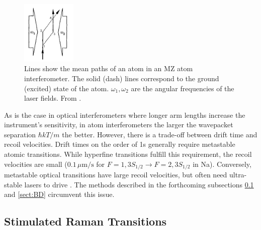\documentclass[reprint,
nofootinbib,
amsmath,amssymb,
aps]{revtex4-1}
\begin{document}
\begin{figure}
	\includegraphics[width=0.23\textwidth]{MZI.png}
	\caption{Lines show the mean paths of an atom in an MZ atom interferometer. The solid (dash) lines correspond to the ground (excited) state of the atom. $\omega_1,\omega_2$ are the angular frequencies of the laser fields. From \cite{kasevich1992measurement}.}
	\label{fig:MZI}
\end{figure}


As is the case in optical interferometers where longer arm lengths increase the instrument's sensitivity, in atom interferometers the larger the wavepacket separation $\hbar k T /m$ the better. However, there is a trade-off between drift time and recoil velocities. Drift times on the order of 1s generally require metastable atomic transitions. While hyperfine transitions fulfill this requirement, the recoil velocities are small ($0.1 \, \mu\text{m/s}$ for $F=1, 3S_{1/2}\to F=2,3S_{1/2}$ in Na). Conversely, metastable optical transitions have large recoil velocities, but often need ultra-stable lasers to drive \cite{kasevich1992measurement}. The methods described in the forthcoming subsections \ref{sect:SRT} and \ref{sect:BD} circumvent this issue. 



\subsection{Stimulated Raman Transitions}\label{sect:SRT}
\end{document}
